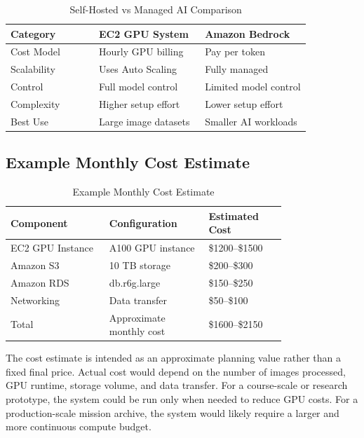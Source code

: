 \documentclass[conference]{IEEEtran}
\begin{document}
	\begin{table}[ht]
		\centering
		\caption{Self-Hosted vs Managed AI Comparison}
		\begin{tabular}{|p{0.25\linewidth}|p{0.30\linewidth}|p{0.30\linewidth}|}
			\hline
			\textbf{Category} & \textbf{EC2 GPU System} & \textbf{Amazon Bedrock} \\ \hline
			Cost Model & Hourly GPU billing & Pay per token \\ \hline
			Scalability & Uses Auto Scaling & Fully managed \\ \hline
			Control & Full model control & Limited model control \\ \hline
			Complexity & Higher setup effort & Lower setup effort \\ \hline
			Best Use & Large image datasets & Smaller AI workloads \\ \hline
		\end{tabular}
	\end{table}
	
	\subsection{Example Monthly Cost Estimate}
	
	\begin{table}[ht]
		\centering
		\caption{Example Monthly Cost Estimate}
		\begin{tabular}{|p{0.28\linewidth}|p{0.28\linewidth}|p{0.22\linewidth}|}
			\hline
			\textbf{Component} & \textbf{Configuration} & \textbf{Estimated Cost} \\ \hline
			EC2 GPU Instance & A100 GPU instance & \$1200--\$1500 \\ \hline
			Amazon S3 & 10 TB storage & \$200--\$300 \\ \hline
			Amazon RDS & db.r6g.large & \$150--\$250 \\ \hline
			Networking & Data transfer & \$50--\$100 \\ \hline
			Total & Approximate monthly cost & \$1600--\$2150 \\ \hline
		\end{tabular}
	\end{table}
	
	The cost estimate is intended as an approximate planning value rather than a fixed final price. Actual cost would depend on the number of images processed, GPU runtime, storage volume, and data transfer. For a course-scale or research prototype, the system could be run only when needed to reduce GPU costs. For a production-scale mission archive, the system would likely require a larger and more continuous compute budget.
	
\end{document}

